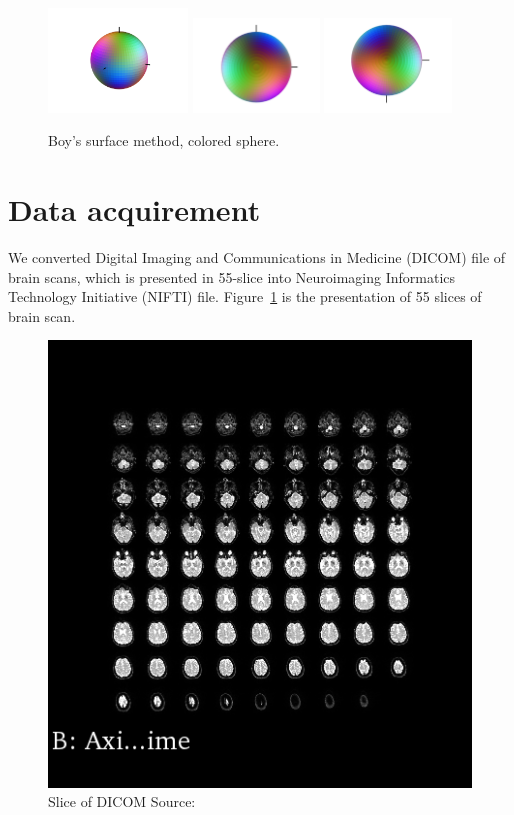 \documentclass[a4paper, 12pt]{report}
\begin{document}
	\begin{figure}
		\centering
		\includegraphics[width=0.33\textwidth]{boys}
		\includegraphics[width=0.3\textwidth]{boys_zIn_yRight}
		\includegraphics[width=0.3\textwidth]{boys_zOut_yRight}
		\caption{Boy's surface method, colored sphere.}
	\end{figure}

\section{Data acquirement}
We converted Digital Imaging and Communications in Medicine (DICOM) file of brain scans, which is presented in 55-slice into Neuroimaging Informatics Technology Initiative (NIFTI) file. Figure~\ref{fig:2} is the presentation of 55 slices of brain scan.

\begin{figure}[ht]
    \centering
    \includegraphics[width = 0.6\columnwidth]{2}
    \caption{ Slice of DICOM  Source:  \cite{???}}
    \label{fig:2}
\end{figure}	
\end{document}
